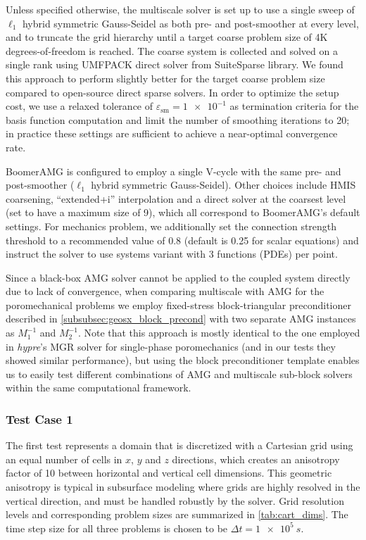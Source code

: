 Unless specified otherwise, the multiscale solver is set up to use a single sweep of $\ell_1$ hybrid symmetric Gauss-Seidel as both pre- and post-smoother at every level, and to truncate the grid hierarchy until a target coarse problem size of 4K degrees-of-freedom is reached.   The coarse system is collected and solved on a single rank using UMFPACK direct solver from SuiteSparse library.   We found this approach to perform slightly better for the target coarse problem size compared to open-source direct sparse solvers.   In order to optimize the setup cost, we use a relaxed tolerance of $\varepsilon_{\text{sm}} = \num{1e-1}$ as termination criteria for the basis function computation and limit the number of smoothing iterations to 20; in practice these settings are sufficient to achieve a near-optimal convergence rate.

BoomerAMG is configured to employ a single V-cycle with the same pre- and post-smoother ($\ell_1$ hybrid symmetric Gauss-Seidel).   Other choices include HMIS coarsening, ``extended+i'' interpolation and a direct solver at the coarsest level (set to have a maximum size of 9), which all correspond to BoomerAMG's default settings.   For mechanics problem, we additionally set the connection strength threshold to a recommended value of 0.8 (default is 0.25 for scalar equations) and instruct the solver to use systems variant with 3 functions (PDEs) per point.

Since a black-box AMG solver cannot be applied to the coupled system directly due to lack of convergence, when comparing multiscale with AMG for the poromechanical problems we employ fixed-stress block-triangular preconditioner described in \cref{subsubsec:geosx_block_precond} with two separate AMG instances as $M_1^{-1}$ and $M_2^{-1}$.   Note that this approach is mostly identical to the one employed in \textit{hypre}'s MGR solver \cite{Bui2020} for single-phase poromechanics (and in our tests they showed similar performance), but using the block preconditioner template enables us to easily test different combinations of AMG and multiscale sub-block solvers within the same computational framework.

\subsubsection{Test Case 1}

The first test represents a  domain that is discretized with a Cartesian grid using an equal number of cells in $x$, $y$ and $z$ directions, which creates an anisotropy factor of 10 between horizontal and vertical cell dimensions.   This geometric anisotropy is typical in subsurface modeling where grids are highly resolved in the vertical direction, and must be handled robustly by the solver.   Grid resolution levels and corresponding problem sizes are summarized in \cref{tab:cart_dims}.   The time step size for all three problems is chosen to be $\Delta t = \qty{1e5}{s}$.

